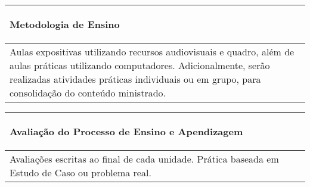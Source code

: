 \begin{table}[h!]
\centering
\begin{small} 
\setlength{\tabcolsep}{3pt} 
\begin{tabular}{|p{15cm}|}\hline

\begin{center}\textbf{Metodologia de Ensino}\end{center}\\ \hline
   Aulas expositivas utilizando recursos audiovisuais e quadro, além de aulas práticas utilizando computadores. Adicionalmente, serão realizadas atividades práticas individuais ou em grupo, para consolidação do conteúdo ministrado.
 \\ \hline
\end{tabular} 
\end{small}
\label{dadosinstituicao}
\end{table}


\begin{table}[h!]
\centering
\begin{small} 
\setlength{\tabcolsep}{3pt} 
\begin{tabular}{|p{15cm}|}\hline

\begin{center}\textbf{Avaliação do Processo de Ensino e Apendizagem}\end{center}\\ \hline
   Avaliações escritas ao final de cada unidade. Prática baseada em Estudo de Caso ou problema real.
 \\ \hline

\end{tabular} 
\end{small}
\label{dadosinstituicao}
\end{table}

